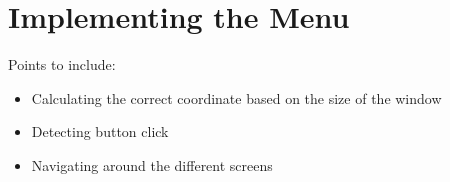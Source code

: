 \section{Implementing the Menu}
\label{sec:imp_menu}

Points to include:

\begin{itemize}
	\item Calculating the correct coordinate based on the size of the window
	\item Detecting button click
	\item Navigating around the different screens
\end{itemize}